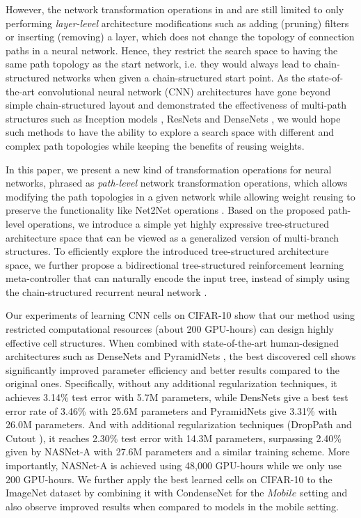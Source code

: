 \documentclass{article}
\begin{document}
However, the network transformation operations in \citet{cai2018efficient} and \citet{ashok2017n2n} are still limited to only performing \emph{layer-level} architecture modifications such as adding (pruning) filters or inserting (removing) a layer, which does not change the topology of connection paths in a neural network. Hence, they restrict the search space to having the same path topology as the start network, i.e. they would always lead to chain-structured networks when given a chain-structured start point. As the state-of-the-art convolutional neural network (CNN) architectures have gone beyond simple chain-structured layout and demonstrated the effectiveness of multi-path structures such as Inception models \cite{szegedy2015going}, ResNets \cite{he2016deep} and DenseNets \cite{huang2016densely}, we would hope such methods to have the ability to explore a search space with different and complex path topologies while keeping the benefits of reusing weights.

In this paper, we present a new kind of transformation operations for neural networks, phrased as \emph{path-level} network transformation operations, which allows modifying the path topologies in a given network while allowing weight reusing to preserve the functionality like Net2Net operations \cite{chen2015net2net}. Based on the proposed path-level operations, we introduce a simple yet highly expressive tree-structured architecture space that can be viewed as a generalized version of multi-branch structures. To efficiently explore the introduced tree-structured architecture space, we further propose a bidirectional tree-structured \cite{tai2015improved} reinforcement learning meta-controller that can naturally encode the input tree, instead of simply using the chain-structured recurrent neural network \cite{zoph2017learning}. 

Our experiments of learning CNN cells on CIFAR-10 show that our method using restricted computational resources (about 200 GPU-hours) can design highly effective cell structures. When combined with state-of-the-art human-designed architectures such as DenseNets \cite{huang2016densely} and PyramidNets \cite{han2016deep}, the best discovered cell shows significantly improved parameter efficiency and better results compared to the original ones. Specifically, without any additional regularization techniques, it achieves 3.14\% test error with 5.7M parameters, while DensNets give a best test error rate of 3.46\% with 25.6M parameters and PyramidNets give 3.31\% with 26.0M parameters. And with additional regularization techniques (DropPath \cite{zoph2017learning} and Cutout \cite{devries2017improved}), it reaches 2.30\% test error with 14.3M parameters, surpassing 2.40\% given by NASNet-A \cite{zoph2017learning} with 27.6M parameters and a similar training scheme. More importantly, NASNet-A is achieved using 48,000 GPU-hours while we only use 200 GPU-hours.
We further apply the best learned cells on CIFAR-10 to the ImageNet dataset by combining it with CondenseNet \cite{huang2017condensenet} for the $Mobile$ setting and also observe improved results when compared to models in the mobile setting.
\end{document}
